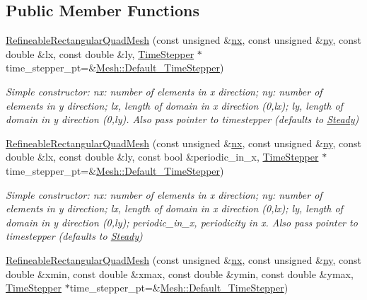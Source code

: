 \subsection*{Public Member Functions}
\begin{DoxyCompactItemize}
\item 
\hyperlink{classoomph_1_1RefineableRectangularQuadMesh_ac00e380a8fa1bdfc63fd25fdf9b5fbf0}{Refineable\+Rectangular\+Quad\+Mesh} (const unsigned \&\hyperlink{classoomph_1_1RectangularQuadMesh_abfef93d6322886cdce14a437186e4821}{nx}, const unsigned \&\hyperlink{classoomph_1_1RectangularQuadMesh_a86d76a55eb7c4e8bca9b74d23c8b0412}{ny}, const double \&lx, const double \&ly, \hyperlink{classoomph_1_1TimeStepper}{Time\+Stepper} $\ast$time\+\_\+stepper\+\_\+pt=\&\hyperlink{classoomph_1_1Mesh_a12243d0fee2b1fcee729ee5a4777ea10}{Mesh\+::\+Default\+\_\+\+Time\+Stepper})
\begin{DoxyCompactList}\small\item\em Simple constructor\+: nx\+: number of elements in x direction; ny\+: number of elements in y direction; lx, length of domain in x direction (0,lx); ly, length of domain in y direction (0,ly). Also pass pointer to timestepper (defaults to \hyperlink{classoomph_1_1Steady}{Steady}) \end{DoxyCompactList}\item 
\hyperlink{classoomph_1_1RefineableRectangularQuadMesh_aa49c7a67bd80678dd088430d7fc0bfc9}{Refineable\+Rectangular\+Quad\+Mesh} (const unsigned \&\hyperlink{classoomph_1_1RectangularQuadMesh_abfef93d6322886cdce14a437186e4821}{nx}, const unsigned \&\hyperlink{classoomph_1_1RectangularQuadMesh_a86d76a55eb7c4e8bca9b74d23c8b0412}{ny}, const double \&lx, const double \&ly, const bool \&periodic\+\_\+in\+\_\+x, \hyperlink{classoomph_1_1TimeStepper}{Time\+Stepper} $\ast$time\+\_\+stepper\+\_\+pt=\&\hyperlink{classoomph_1_1Mesh_a12243d0fee2b1fcee729ee5a4777ea10}{Mesh\+::\+Default\+\_\+\+Time\+Stepper})
\begin{DoxyCompactList}\small\item\em Simple constructor\+: nx\+: number of elements in x direction; ny\+: number of elements in y direction; lx, length of domain in x direction (0,lx); ly, length of domain in y direction (0,ly); periodic\+\_\+in\+\_\+x, periodicity in x. Also pass pointer to timestepper (defaults to \hyperlink{classoomph_1_1Steady}{Steady}) \end{DoxyCompactList}\item 
\hyperlink{classoomph_1_1RefineableRectangularQuadMesh_ad4e8f11be4917fe7eeb9de2213a98f7b}{Refineable\+Rectangular\+Quad\+Mesh} (const unsigned \&\hyperlink{classoomph_1_1RectangularQuadMesh_abfef93d6322886cdce14a437186e4821}{nx}, const unsigned \&\hyperlink{classoomph_1_1RectangularQuadMesh_a86d76a55eb7c4e8bca9b74d23c8b0412}{ny}, const double \&xmin, const double \&xmax, const double \&ymin, const double \&ymax, \hyperlink{classoomph_1_1TimeStepper}{Time\+Stepper} $\ast$time\+\_\+stepper\+\_\+pt=\&\hyperlink{classoomph_1_1Mesh_a12243d0fee2b1fcee729ee5a4777ea10}{Mesh\+::\+Default\+\_\+\+Time\+Stepper})

\end{DoxyCompactItemize}
